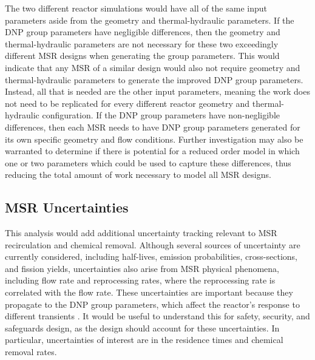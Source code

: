 The two different reactor simulations would have all of the same input parameters aside from the geometry and thermal-hydraulic parameters.
If the \gls{DNP} group parameters have negligible differences, then the geometry and thermal-hydraulic parameters are not necessary for these two exceedingly different \gls{MSR} designs when generating the group parameters.
This would indicate that any \gls{MSR} of a similar design would also not require geometry and thermal-hydraulic parameters to generate the improved \gls{DNP} group parameters.
Instead, all that is needed are the other input parameters, meaning the work does not need to be replicated for every different reactor geometry and thermal-hydraulic configuration.
If the \gls{DNP} group parameters have non-negligible differences, then each \gls{MSR} needs to have \gls{DNP} group parameters generated for its own specific geometry and flow conditions.
Further investigation may also be warranted to determine if there is potential for a reduced order model in which one or two parameters which could be used to capture these differences, thus reducing the total amount of work necessary to model all \gls{MSR} designs.


\subsection{MSR Uncertainties}
This analysis would add additional uncertainty tracking relevant to \gls{MSR} recirculation and chemical removal.
Although several sources of uncertainty are currently considered, including half-lives, emission probabilities, cross-sections, and fission yields, uncertainties also arise from \gls{MSR} physical phenomena, including flow rate and reprocessing rates, where the reprocessing rate is correlated with the flow rate.
These uncertainties are important because they propagate to the \gls{DNP} group parameters, which affect the reactor's response to different transients \cite{radaideh2019new}.
It would be useful to understand this for safety, security, and safeguards design, as the design should account for these uncertainties.
In particular, uncertainties of interest are in the residence times and chemical removal rates.

